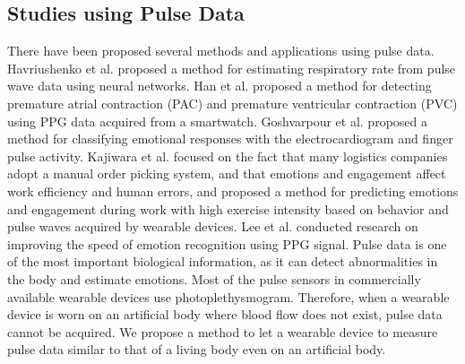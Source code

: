 \documentclass[sigchi,authordraft]{acmart}
\begin{document}
\subsection{Studies using Pulse Data}
There have been proposed several methods and applications using pulse data.
Havriushenko et al.\cite{respiratory_rate_estimation} proposed a method for estimating respiratory rate from pulse wave data using neural networks. %
Han et al.\cite{arrhythmia_detection} proposed a method for detecting premature atrial contraction (PAC) and premature ventricular contraction (PVC) using PPG data acquired from a smartwatch.
Goshvarpour et al.\cite{emotion_recognition_poincare} proposed a method for classifying emotional responses with the electrocardiogram and finger pulse activity. %
Kajiwara et al.\cite{pulse_order_picking} focused on the fact that many logistics companies adopt a manual order picking system, and that emotions and engagement affect work efficiency and human errors, and proposed a method for predicting emotions and engagement during work with high exercise intensity based on behavior and pulse waves acquired by wearable devices. %
Lee et al.\cite{fast_emotion_recognition} conducted research on improving the speed of emotion recognition using PPG signal. %
Pulse data is one of the most important biological information, as it can detect abnormalities in the body and estimate emotions. Most of the pulse sensors in commercially available wearable devices use photoplethysmogram. Therefore, when a wearable device is worn on an artificial body where blood flow does not exist, pulse data cannot be acquired. We propose a method to let a wearable device to measure pulse data similar to that of a living body even on an artificial body.
\end{document}
